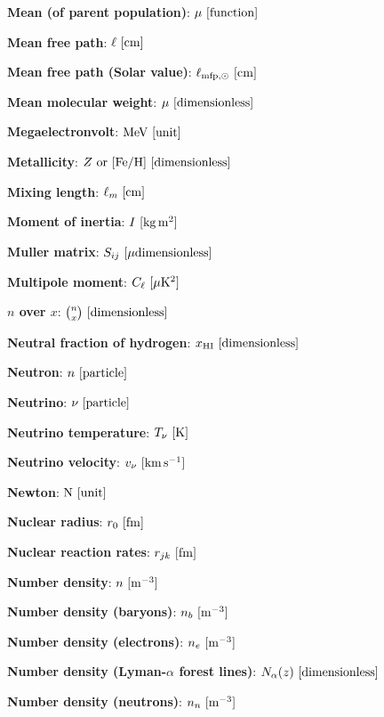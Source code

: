 \documentclass[a4paper,10pt]{article}
\begin{document}
{\noindent}\textbf{Mean (of parent population)}: $\mu ~ [{\rm function}]$

{\noindent}\textbf{Mean free path}: $\ell ~ [{\rm cm}]$

{\noindent}\textbf{Mean free path (Solar value)}: $\ell_{{\rm mfp},\odot} ~ [{\rm cm}]$

{\noindent}\textbf{Mean molecular weight}: $\mu ~ [{\rm dimensionless}]$

{\noindent}\textbf{Megaelectronvolt}: ${\rm MeV} ~ [{\rm unit}]$

{\noindent}\textbf{Metallicity}: $Z~{\rm or}~[{\rm Fe/H}] ~ [{\rm dimensionless}]$

{\noindent}\textbf{Mixing length}: $\ell_m ~ [{\rm cm}]$

{\noindent}\textbf{Moment of inertia}: $I ~ [{\rm kg\,m^2}]$

{\noindent}\textbf{Muller matrix}: $S_{ij} ~ [{\rm \mu dimensionless}]$

{\noindent}\textbf{Multipole moment}: $C_\ell ~ [{\rm \mu K^2}]$

{\noindent}\textbf{$n$ over $x$}: $\binom{n}{x} ~ [{\rm dimensionless}]$

{\noindent}\textbf{Neutral fraction of hydrogen}: $x_\mathrm{HI} ~ [{\rm dimensionless}]$

{\noindent}\textbf{Neutron}: $n ~ [{\rm particle}]$

{\noindent}\textbf{Neutrino}: $\nu ~ [{\rm particle}]$

{\noindent}\textbf{Neutrino temperature}: $T_\nu ~ [{\rm K}]$

{\noindent}\textbf{Neutrino velocity}: $v_\nu ~ [{\rm km\,s^{-1}}]$

{\noindent}\textbf{Newton}: ${\rm N} ~ [{\rm unit}]$

{\noindent}\textbf{Nuclear radius}: $r_0 ~ [{\rm fm}]$

{\noindent}\textbf{Nuclear reaction rates}: $r_{jk} ~ [{\rm fm}]$

{\noindent}\textbf{Number density}: $n ~ [{\rm m^{-3}}]$

{\noindent}\textbf{Number density (baryons)}: $n_b ~ [{\rm m^{-3}}]$

{\noindent}\textbf{Number density (electrons)}: $n_e ~ [{\rm m^{-3}}]$

{\noindent}\textbf{Number density (Lyman-$\alpha$ forest lines)}: $N_\alpha(z) ~ [{\rm dimensionless}]$

{\noindent}\textbf{Number density (neutrons)}: $n_n ~ [{\rm m^{-3}}]$
\end{document}
